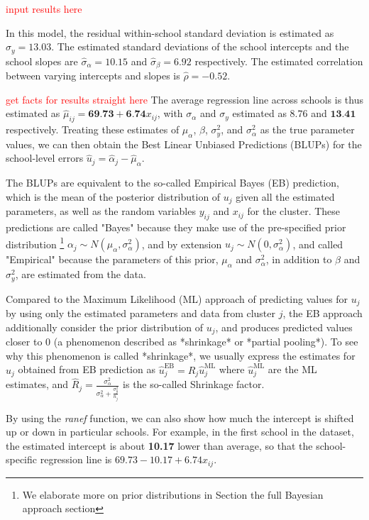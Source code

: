 \textcolor{red}{input results here}

In this model, the residual within-school standard deviation is estimated as $\hat{\sigma}_{y}=13.03$. The estimated standard deviations of the school intercepts and the school slopes are $\hat{\sigma}_{\alpha}= 10.15$ and $\hat{\sigma}_{\beta}=6.92$ respectively. The estimated correlation between varying intercepts and slopes is $\hat{\rho} = -0.52$. 

\textcolor{red}{get facts for results straight here}
The average regression line across schools is thus estimated as $\hat{\mu}_{ij} = \textbf{69.73} + \textbf{6.74} x_{ij}$, with $\sigma_\alpha$ and $\sigma_y$ estimated as $8.76$ and $\textbf{13.41}$ respectively.  Treating these estimates of $\mu_\alpha$, $\beta$, $\sigma^2_{y}$, and $\sigma^2_{\alpha}$ as the true parameter values, we can then obtain the Best Linear Unbiased Predictions (BLUPs) for the school-level errors $\hat{u}_j = \hat{\alpha}_{j} - \hat{\mu}_{\alpha}$. 

The BLUPs are equivalent to the so-called Empirical Bayes (EB) prediction, which is the mean of the posterior distribution of $u_{j}$ given all the estimated parameters, as well as the random variables $y_{ij}$ and $x_{ij}$ for the cluster.  These predictions are called "Bayes" because they make use of the pre-specified prior distribution \footnote{We elaborate more on prior distributions in Section the full Bayesian approach section} $\alpha_j \sim N(\mu_\alpha, \sigma^2_\alpha)$, and by extension $u_j \sim N(0, \sigma^2_\alpha)$, and called "Empirical" because the parameters of this prior, $\mu_\alpha$ and $\sigma^2_{\alpha}$, in addition to $\beta$ and $\sigma^2_{y}$, are estimated from the data.

Compared to the Maximum Likelihood (ML) approach of predicting values for $u_j$ by using only the estimated parameters and data from cluster $j$, the EB approach additionally consider the prior distribution of $u_{j}$, and produces predicted values closer to $0$ (a phenomenon described as *shrinkage* or *partial pooling*).  To see why this phenomenon is called *shrinkage*, we usually express the estimates for $u_j$ obtained from EB prediction as $\hat{u}_j^{\text{EB}} = \hat{R}_j\hat{u}_j^{\text{ML}}$ where $\hat{u}_j^{\text{ML}}$ are the ML estimates, and $\hat{R}_j = \frac{\sigma_\alpha^2}{\sigma_\alpha^2 + \frac{\sigma_y^2}{n_j}}$ is the so-called Shrinkage factor.

By using the \textit{ranef} function, we can also show how much the intercept is shifted up or down in particular schools. For example, in the first school in the dataset, the estimated intercept is about \textbf{10.17} lower than average, so that the school-specific regression line is $69.73 - 10.17 + 6.74 x_{ij}$.


